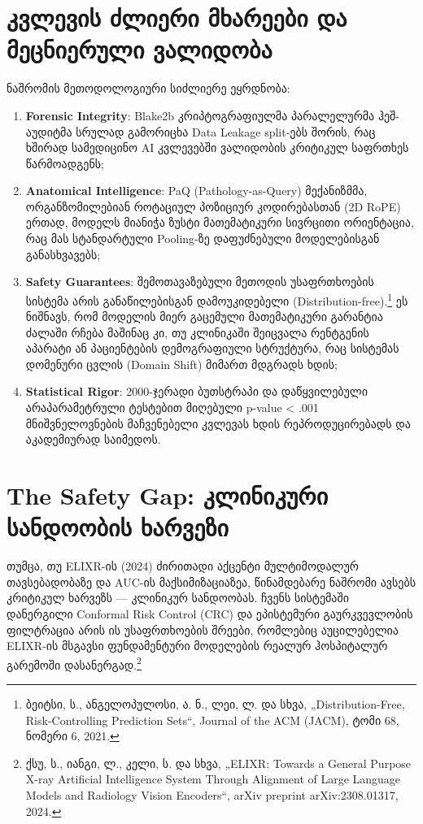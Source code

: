 \documentclass[12pt,a4paper,oneside]{report}
\begin{document}
\section{კვლევის ძლიერი მხარეები და მეცნიერული ვალიდობა}
ნაშრომის მეთოდოლოგიური სიძლიერე ეყრდნობა:
\begin{enumerate}[leftmargin=1.6em]
    \item \textbf{Forensic Integrity}: Blake2b კრიპტოგრაფიულმა პარალელურმა ჰეშ-აუდიტმა სრულად გამორიცხა Data Leakage split-ებს შორის, რაც ხშირად სამედიცინო AI კვლევებში ვალიდობის კრიტიკულ საფრთხეს წარმოადგენს;
    \item \textbf{Anatomical Intelligence}: PaQ (Pathology-as-Query) მექანიზმმა, ორგანზომილებიან როტაციულ პოზიციურ კოდირებასთან (2D RoPE) ერთად, მოდელს მიანიჭა ზუსტი მათემატიკური სივრცითი ორიენტაცია, რაც მას სტანდარტული Pooling-ზე დაფუძნებული მოდელებისგან განასხვავებს;
    \item \textbf{Safety Guarantees}: შემოთავაზებული მეთოდის უსაფრთხოების სისტემა არის განაწილებისგან დამოუკიდებელი (Distribution-free).\footnote{ბეიტსი, ს., ანგელოპულოსი, ა. ნ., ლეი, ლ. და სხვა, „Distribution-Free, Risk-Controlling Prediction Sets“, Journal of the ACM (JACM), ტომი 68, ნომერი 6, 2021.} ეს ნიშნავს, რომ მოდელის მიერ გაცემული მათემატიკური გარანტია ძალაში რჩება მაშინაც კი, თუ კლინიკაში შეიცვალა რენტგენის აპარატი ან პაციენტების დემოგრაფიული სტრუქტურა, რაც სისტემას დომენური ცვლის (Domain Shift) მიმართ მდგრადს ხდის;
    \item \textbf{Statistical Rigor}: 2000-ჯერადი ბუთსტრაპი და დაწყვილებული არაპარამეტრული ტესტებით მიღებული p-value < .001 მნიშვნელოვნების მაჩვენებელი კვლევას ხდის რეპროდუცირებადს და აკადემიურად საიმედოს.
\end{enumerate}

\section{The Safety Gap: კლინიკური სანდოობის ხარვეზი}
თუმცა, თუ ELIXR-ის (2024) ძირითადი აქცენტი მულტიმოდალურ თავსებადობაზე და AUC-ის მაქსიმიზაციაზეა, წინამდებარე ნაშრომი ავსებს კრიტიკულ ხარვეზს — კლინიკურ სანდოობას. ჩვენს სისტემაში დანერგილი Conformal Risk Control (CRC) და ეპისტემური გაურკვევლობის ფილტრაცია არის ის უსაფრთხოების შრეები, რომლებიც აუცილებელია ELIXR-ის მსგავსი ფუნდამენტური მოდელების რეალურ ჰოსპიტალურ გარემოში დასანერგად.\footnote{ქსუ, ს., იანგი, ლ., კელი, ს. და სხვა, „ELIXR: Towards a General Purpose X-ray Artificial Intelligence System Through Alignment of Large Language Models and Radiology Vision Encoders“, arXiv preprint arXiv:2308.01317, 2024.}
\end{document}
